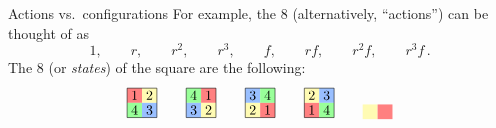 \documentclass[8pt, handout]{beamer}
\newcommand{\Pause}{}      %
\begin{document}
\begin{frame}{Actions vs.\ configurations}
  For example, the 8  (alternatively, ``actions'')
  can be thought of as
  \[
  1,\qquad r,\qquad r^2,\qquad r^3,\qquad f,\qquad rf,\qquad r^2f,\qquad r^3f\,.
  \]
  \Pause The 8  (or \emph{states}) of the
  square are the following:
  \[
    \begin{tikzpicture}[scale=.75]
      \path[fill=actRed] (0,.5) rectangle ++(.5,.5); 
      \path[fill=actYellow] (.5,.5) rectangle ++(.5,.5);
      \path[fill=actGreen] (0,0) rectangle ++(.5,.5);
      \path[fill=actBlue] (.5,0) rectangle ++(.5,.5);
      \draw (.25,.75) node{$1$}; \draw (.75,.75) node{$2$};
      \draw (.25,.25) node{$4$}; \draw (.75,.25) node{$3$};
      \draw (0,0) rectangle (1,1);
    \end{tikzpicture}
    \qquad
    \begin{tikzpicture}[scale=.75]
      \path[fill=actGreen] (0,.5) rectangle ++(.5,.5); 
      \path[fill=actRed] (.5,.5) rectangle ++(.5,.5);
      \path[fill=actBlue] (0,0) rectangle ++(.5,.5);
      \path[fill=actYellow] (.5,0) rectangle ++(.5,.5);
      \draw (0,0) rectangle (1,1);
      \draw (.25,.75) node{$4$}; \draw (.75,.75) node{$1$};
        \draw (.25,.25) node{$3$}; \draw (.75,.25) node{$2$};
    \end{tikzpicture}
    \qquad
    \begin{tikzpicture}[scale=.75]
      \path[fill=actBlue] (0,.5) rectangle ++(.5,.5); 
      \path[fill=actGreen] (.5,.5) rectangle ++(.5,.5);
      \path[fill=actYellow] (0,0) rectangle ++(.5,.5);
      \path[fill=actRed] (.5,0) rectangle ++(.5,.5);
      \draw (0,0) rectangle (1,1);
      \draw (.25,.75) node{$3$}; \draw (.75,.75) node{$4$};
        \draw (.25,.25) node{$2$}; \draw (.75,.25) node{$1$};
    \end{tikzpicture}
    \qquad
    \begin{tikzpicture}[scale=.75]
      \path[fill=actYellow] (0,.5) rectangle ++(.5,.5); 
      \path[fill=actBlue] (.5,.5) rectangle ++(.5,.5);
      \path[fill=actRed] (0,0) rectangle ++(.5,.5);
      \path[fill=actGreen] (.5,0) rectangle ++(.5,.5);
      \draw (0,0) rectangle (1,1);
      \draw (.25,.75) node{$2$}; \draw (.75,.75) node{$3$};
      \draw (.25,.25) node{$1$}; \draw (.75,.25) node{$4$};
    \end{tikzpicture}
    \qquad
    \begin{tikzpicture}[scale=.75]
      \path[fill=actYellow] (0,.5) rectangle ++(.5,.5); 
      \path[fill=actRed] (.5,.5) rectangle ++(.5,.5);

\end{tikzpicture}\]
\end{frame}
\end{document}
